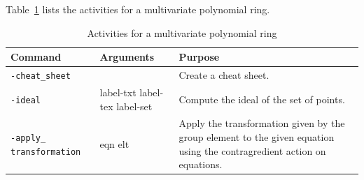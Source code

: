Table~\ref{tab:polynomial:ring:activities} lists the activities  
for a multivariate polynomial ring.
\begin{table}
\begin{center}
\begin{tabular}{|p{4cm}|p{3cm}|p{7cm}|}
\hline
Command & Arguments & Purpose \\
\hline
\hline
\verb'-cheat_sheet' &  & Create a cheat sheet. \\
\hline
\verb'-ideal' & label-txt label-tex label-set & Compute the ideal of the set of points. \\
\hline
\verb'-apply_' \verb'transformation' & eqn elt & Apply the transformation given by the group element to the given equation using the contragredient action on equations. \\
\hline
\end{tabular}
\end{center}
\caption{\label{tab:polynomial:ring:activities}Activities for a multivariate polynomial ring}
\end{table}


\bigskip


